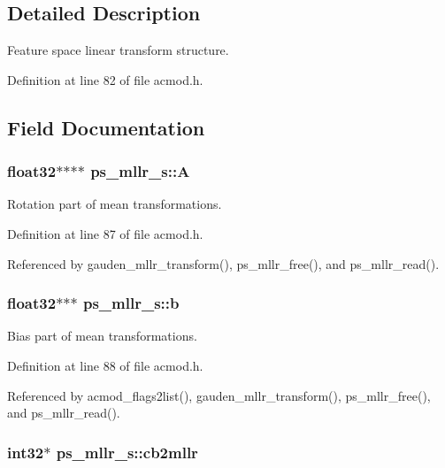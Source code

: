 \subsection{Detailed Description}
Feature space linear transform structure. 

Definition at line 82 of file acmod.\-h.



\subsection{Field Documentation}
\subsubsection[{A}]{\setlength{\rightskip}{0pt plus 5cm}float32$\ast$$\ast$$\ast$$\ast$ ps\-\_\-mllr\-\_\-s\-::\-A}\label{structps__mllr__s_a4cfa5d4c6637282b947b525a673cc3d0}


Rotation part of mean transformations. 



Definition at line 87 of file acmod.\-h.



Referenced by gauden\-\_\-mllr\-\_\-transform(), ps\-\_\-mllr\-\_\-free(), and ps\-\_\-mllr\-\_\-read().

\subsubsection[{b}]{\setlength{\rightskip}{0pt plus 5cm}float32$\ast$$\ast$$\ast$ ps\-\_\-mllr\-\_\-s\-::b}\label{structps__mllr__s_a65430ba654d0af5e508715de24077f2d}


Bias part of mean transformations. 



Definition at line 88 of file acmod.\-h.



Referenced by acmod\-\_\-flags2list(), gauden\-\_\-mllr\-\_\-transform(), ps\-\_\-mllr\-\_\-free(), and ps\-\_\-mllr\-\_\-read().

\subsubsection[{cb2mllr}]{\setlength{\rightskip}{0pt plus 5cm}int32$\ast$ ps\-\_\-mllr\-\_\-s\-::cb2mllr}\label{structps__mllr__s_a745c4b69be55cef8629abab02f474bb9}


